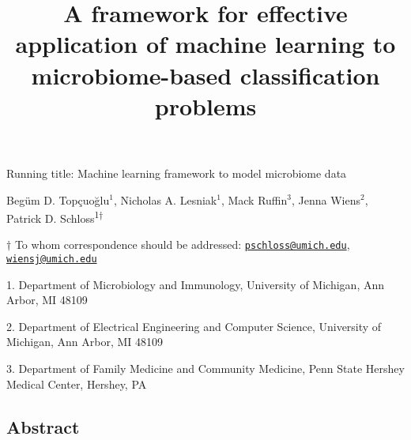 \documentclass[
  11pt,
]{article}
\title{\textbf{A framework for effective application of machine learning to
microbiome-based classification problems}}
\author{}
\date{\vspace{-2.5em}}
\begin{document}
\maketitle

\vspace{30mm}

Running title: Machine learning framework to model microbiome data

\vspace{20mm}

Begüm D. Topçuoğlu\({^1}\), Nicholas A. Lesniak\({^1}\), Mack
Ruffin\({^3}\), Jenna Wiens\({^2}\), Patrick D.
Schloss\textsuperscript{1\(\dagger\)}

\vspace{30mm}

\(\dagger\) To whom correspondence should be addressed:
\href{mailto:pschloss@umich.edu}{\nolinkurl{pschloss@umich.edu}},
\href{mailto:wiensj@umich.edu}{\nolinkurl{wiensj@umich.edu}}

1. Department of Microbiology and Immunology, University of Michigan,
Ann Arbor, MI 48109

2. Department of Electrical Engineering and Computer Science, University
of Michigan, Ann Arbor, MI 48109

3. Department of Family Medicine and Community Medicine, Penn State
Hershey Medical Center, Hershey, PA

\newpage
\linenumbers

\hypertarget{abstract}{%
\subsection{Abstract}\label{abstract}}
\end{document}
